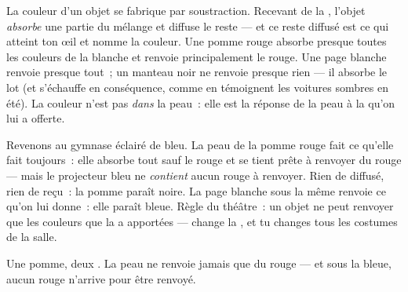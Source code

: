 \begin{proposition}\label{prop:g8:colors-spectra:objectcolor}
La couleur d'un objet  se fabrique par soustraction. Recevant de
la , l'objet \emph{absorbe} une partie du mélange et diffuse le
reste --- et ce reste diffusé est ce qui atteint ton œil et nomme la
couleur. Une pomme rouge absorbe presque toutes les couleurs de la
 blanche et renvoie principalement le rouge. Une page blanche
renvoie presque tout~; un manteau noir ne renvoie presque rien --- il
absorbe le lot (et s'échauffe en conséquence, comme en témoignent les
voitures sombres en été). La couleur n'est pas \emph{dans} la peau~:
elle est la réponse de la peau à la  qu'on lui a offerte.
\end{proposition}

\begin{example}\label{ex:g8:colors-spectra:gym}
Revenons au gymnase éclairé de bleu. La peau de la pomme rouge fait ce
qu'elle fait toujours~: elle absorbe tout sauf le rouge et se tient
prête à renvoyer du rouge --- mais le projecteur bleu ne
\emph{contient} aucun rouge à renvoyer. Rien de diffusé, rien de
reçu~: la pomme paraît noire. La page blanche sous la même 
renvoie ce qu'on lui donne~: elle paraît bleue. Règle du théâtre~: un
objet ne peut renvoyer que les couleurs que la  a apportées ---
change la , et tu changes tous les costumes de la salle.
\end{example}

\begin{omfigure}

{\small Une pomme, deux . La peau ne renvoie jamais que du
rouge --- et sous la  bleue, aucun rouge n'arrive pour être
renvoyé.}
\end{omfigure}

